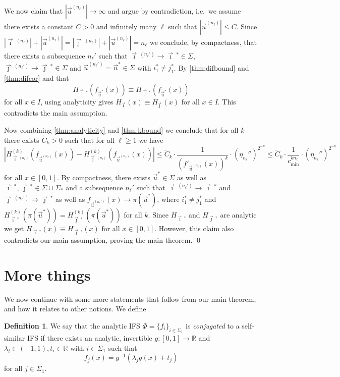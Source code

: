 \documentclass[12pt,]{article}
\theoremstyle{definition}
\newtheorem{definition}[theorem]{Definition}
\theoremstyle{remark}
\renewcommand{\Bbb}[1]{\mathbb{#1}}
\newcommand{\bbR}{{\Bbb R}}        %
\newcommand{\0}{\mathbf{0}}
\newcommand{\bi}{\vec{\imath}\,}
\newcommand{\bj}{\vec{\jmath}\,}
\newcommand{\bu}{{\vec{u}}}
\begin{document}
We now claim that $|\bu^{(n_\ell)}| \to \infty$ and argue by contradiction, i.e.\ we assume there
exists a constant $C>0$ and infinitely many $\ell$ such that $|\bu^{(n_\ell)}| \leq C$.
Since $|\bi^{(n_\ell)}|+ |\bu^{(n_\ell)}| = |\bj^{(n_\ell)}|+|\bu^{(n_\ell)}| = n_\ell$ we conclude, by compactness, that
there exists a subsequence $n_\ell'$ such that $\bi^{(n_\ell')} \to \bi^*\in\Sigma$,
$\bj^{(n_\ell')}\to\bj^*\in\Sigma$ and $\bu^{(n_\ell')}=\bu^*\in\Sigma$ with $i_1^*\neq j_1^*$.
By \cref{thm:difbound} and \cref{thm:difcor} and that
\[
  H_{\bi^*}(f_{\bu^*}(x))\equiv H_{\bj^*}(f_{\bu^*}(x))
\]
for all $x\in I$, using analyticity gives $H_{\bi}(x) \equiv H_{\bj}(x)$ for all $x\in I$. This
contradicts the main assumption.

Now combining \cref{thm:analyticity} and \cref{thm:kbound} we conclude that for all $k$ there
exists $\widetilde{C}_k>0$ such that for all $\ell\geq 1$ we have
\[
  |H_{\bi^{(n_\ell)}}^{(k)}(f_{\bu^{(n_\ell)}}(x)) - H_{\bj^{(n_\ell)}}^{(k)}(f_{\bu^{(n_\ell)}}(x))|
  \leq \widetilde{C}_k \cdot \frac{1}{(f'_{\bu^{(n_\ell)}}(x))^k}\cdot\left(\eta_{n_\ell}''\right)^{2^{-k}}\leq\widetilde{C}_k \cdot \frac{1}{c_{\min}^{k n_\ell}}\cdot\left(\eta_{n_\ell}''\right)^{2^{-k}}
\]
for all $x\in[0,1]$.
By compactness, there exists $\bu^*\in\Sigma$ as well as $\bi^*,\bj^*\in\Sigma\cup\Sigma_*$ and a
subsequence $n_\ell'$ such that $\bi^{(n_\ell')}\to \bi^*$ and $\bj^{(n_\ell')}\to \bj^*$ as well as
$f_{\bu^{(n_\ell')}}(x) \to \pi(\bu^*)$, where $i_1^*\neq j_1^*$ and
$H_{\bi^*}^{(k)}(\pi(\bu^*))=H_{\bj^*}^{(k)}(\pi(\bu^*))$ for all $k$.
Since $H_{\bi^*}$ and $H_{\bj^*}$ are analytic we get $H_{\bi^*}(x)\equiv H_{\bj^*}(x)$ for all
$x\in[0,1]$. However, this claim also contradicts our main assumption, proving the main theorem.
\qed

\section{More things}
We now continue with some more statements that follow from our main theorem, and how it relates to
other notions.
We define
\begin{definition}
  We say that the analytic IFS $\Phi = \{f_i\}_{i\in\Sigma_1}$ is \emph{conjugated} to a
  self-similar IFS if there exists an analytic, invertible $g:[0,1]\to\bbR$ and $\lambda_i
  \in(-1,1), t_i\in\bbR$ with $i\in\Sigma_1$ such that
  \[
    f_{j}(x) = g^{-1}(\lambda_j g(x) + t_j)
  \]
  for all $j\in\Sigma_1$.
\end{definition}
\end{document}
